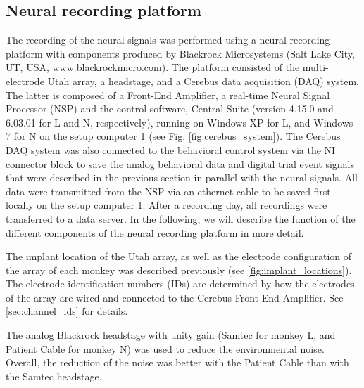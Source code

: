 \subsection{Neural recording platform}
\label{sec:neural_recording_platform}
The recording of the neural signals was performed using a neural recording platform with components produced by Blackrock Microsystems (Salt Lake City, UT, USA, www.blackrockmicro.com). The platform consisted of the multi-electrode Utah array, a headstage, and a Cerebus data acquisition (DAQ) system. The latter is composed of a Front-End Amplifier, a real-time Neural Signal Processor (NSP) and the control software, Central Suite (version 4.15.0 and 6.03.01 for L and N, respectively), running on Windows XP for L, and Windows 7 for N on the setup computer 1 (see Fig. \cref{fig:cerebus_system}). The Cerebus DAQ system was also connected to the behavioral control system via the NI connector block to save the analog behavioral data and digital trial event signals that were described in the previous section in parallel with the neural signals. All data were transmitted from the NSP via an ethernet cable to be saved first locally on the setup computer 1. After a recording day, all recordings were transferred to a data server. In the following, we will describe the function of the different components of the neural recording platform in more detail.

The implant location of the Utah array, as well as the electrode configuration of the array of each monkey was described previously (see \cref{fig:implant_locations}). The electrode identification numbers (IDs) are determined by how the electrodes of the array are wired and connected to the Cerebus Front-End Amplifier. See \cref{sec:channel_ids} for details.

The analog Blackrock headstage with unity gain (Samtec for monkey L, and Patient Cable for monkey N) was used to reduce the environmental noise. Overall, the reduction of the noise was better with the Patient Cable than with the Samtec headstage.

